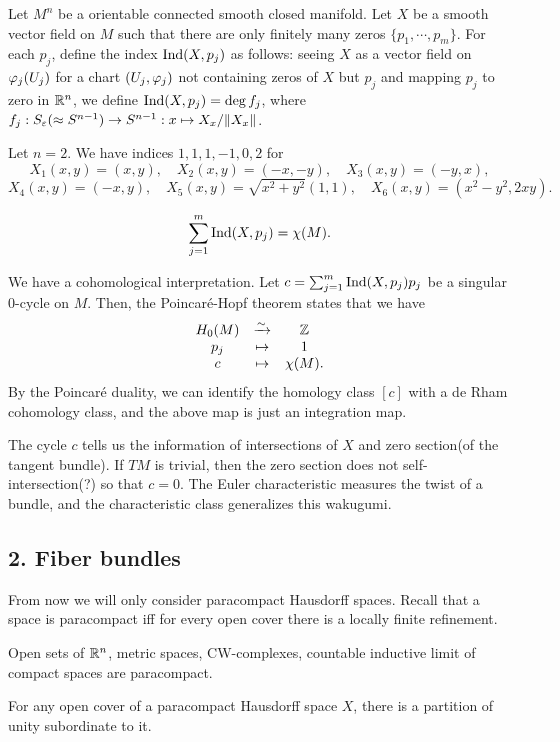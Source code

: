 \documentclass{../../small}
\begin{document}
Let $M^n$ be a orientable connected smooth closed manifold.
Let $X$ be a smooth vector field on $M$ such that there are only finitely many zeros $\{p_1,\cdots,p_m\}$.
For each $p_j$, define the index $\operatorname{Ind}(X,p_j)$ as follows: 
seeing $X$ as a vector field on $\varphi_j(U_j)$ for a chart $(U_j,\varphi_j)$ not containing zeros of $X$ but $p_j$ and mapping $p_j$ to zero in $\mathbb{R}^n$, we define $\operatorname{Ind}(X,p_j)=\deg f_j$, where $f_j:S_\varepsilon(\approx S^{n-1})\to S^{n-1}:x\mapsto X_x/\|X_x\|$.

\begin{ex*}
Let $n=2$.
We have indices $1, 1, 1, -1, 0, 2$ for
\[X_1(x,y)=(x,y),\quad X_2(x,y)=(-x,-y),\quad X_3(x,y)=(-y,x),\]
\[X_4(x,y)=(-x,y),\quad X_5(x,y)=\sqrt{x^2+y^2}(1,1),\quad X_6(x,y)=(x^2-y^2,2xy).\]
\end{ex*}

\begin{thm*}
\[\sum_{j=1}^m\operatorname{Ind}(X,p_j)=\chi(M).\]
\end{thm*}

We have a cohomological interpretation.
Let $c=\sum_{j=1}^m\operatorname{Ind}(X,p_j)p_j$ be a singular 0-cycle on $M$.
Then, the Poincar\'e-Hopf theorem states that we have
\[\begin{array}{ccc}
H_0(M)&\xrightarrow{\sim}&\mathbb{Z}\\
p_j&\mapsto&1\\
c&\mapsto&\chi(M).
\end{array}\]
By the Poincar\'e duality, we can identify the homology class $[c]$ with a de Rham cohomology class, and the above map is just an integration map.

The cycle $c$ tells us the information of intersections of $X$ and zero section(of the tangent bundle).
If $TM$ is trivial, then the zero section does not self-intersection(?) so that $c=0$.
The Euler characteristic measures the twist of a bundle, and the characteristic class generalizes this wakugumi.


\subsection*{2. Fiber bundles}

From now we will only consider paracompact Hausdorff spaces.
Recall that a space is paracompact iff for every open cover there is a locally finite refinement.
\begin{ex*}
Open sets of $\mathbb{R}^n$, metric spaces, CW-complexes, countable inductive limit of compact spaces are paracompact.
\end{ex*}
\begin{thm}
For any open cover of a paracompact Hausdorff space $X$, there is a partition of unity subordinate to it.
\end{thm}
\end{document}
